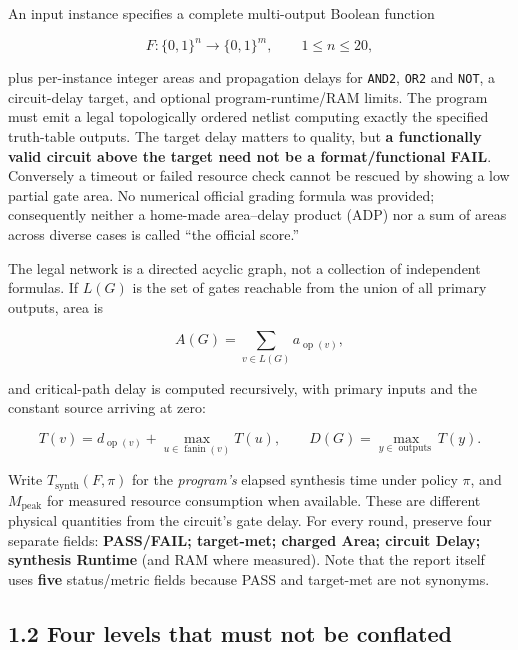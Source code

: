 \documentclass[a4paper,10pt]{article}
\theoremstyle{definition}
\theoremstyle{remark}
\begin{document}
An input instance specifies a complete multi-output Boolean function

\[
F:\{0,1\}^{n}\to\{0,1\}^{m},\qquad 1\le n\le20,
\]

plus per-instance integer areas and propagation delays for \texttt{AND2}, \texttt{OR2} and \texttt{NOT}, a circuit-delay target, and optional program-runtime/RAM limits. The program must emit a legal topologically ordered netlist computing exactly the specified truth-table outputs. The target delay matters to quality, but \textbf{a functionally valid circuit above the target need not be a format/functional FAIL}. Conversely a timeout or failed resource check cannot be rescued by showing a low partial gate area. No numerical official grading formula was provided; consequently neither a home-made area--delay product (ADP) nor a sum of areas across diverse cases is called ``the official score.''

The legal network is a directed acyclic graph, not a collection of independent formulas. If \(L(G)\) is the set of gates reachable from the union of all primary outputs, area is

\[
A(G)=\sum_{v\in L(G)} a_{\operatorname{op}(v)},
\]

and critical-path delay is computed recursively, with primary inputs and the constant source arriving at zero:

\[
T(v)=d_{\operatorname{op}(v)}+\max_{u\in\operatorname{fanin}(v)}T(u),
\qquad D(G)=\max_{y\in\operatorname{outputs}}T(y).
\]

Write \(T_{\mathrm{synth}}(F,\pi)\) for the \emph{program's} elapsed synthesis time under policy \(\pi\), and \(M_{\mathrm{peak}}\) for measured resource consumption when available. These are different physical quantities from the circuit's gate delay. For every round, preserve four separate fields: \textbf{PASS/FAIL; target-met; charged Area; circuit Delay; synthesis Runtime} (and RAM where measured). Note that the report itself uses \textbf{five} status/metric fields because PASS and target-met are not synonyms.

\subsection{1.2 Four levels that must not be conflated}\label{four-levels-that-must-not-be-conflated}
\end{document}
